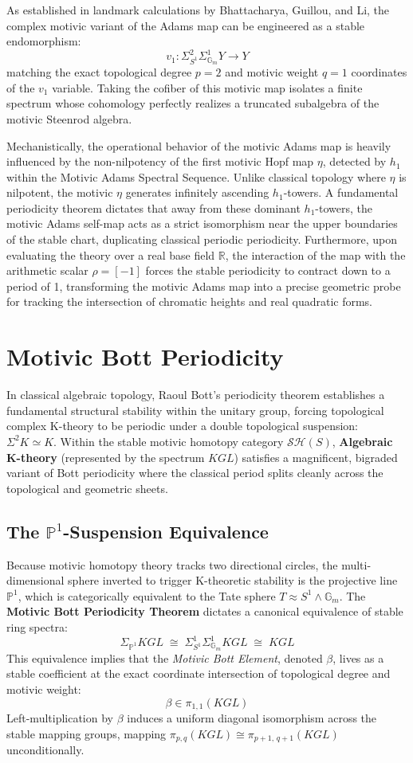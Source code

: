 \documentclass[11pt,oneside]{article}
\begin{document}
As established in landmark calculations by Bhattacharya, Guillou, and Li, the complex motivic variant of the Adams map can be engineered as a stable endomorphism:
\[ v_1: \Sigma_{S^1}^2 \Sigma_{\mathbb{G}_m}^1 Y \longrightarrow Y \]
matching the exact topological degree $p=2$ and motivic weight $q=1$ coordinates of the $v_1$ variable. Taking the cofiber of this motivic map isolates a finite spectrum whose cohomology perfectly realizes a truncated subalgebra of the motivic Steenrod algebra.

Mechanistically, the operational behavior of the motivic Adams map is heavily influenced by the non-nilpotency of the first motivic Hopf map $\eta$, detected by $h_1$ within the Motivic Adams Spectral Sequence. Unlike classical topology where $\eta$ is nilpotent, the motivic $\eta$ generates infinitely ascending $h_1$-towers. A fundamental periodicity theorem dictates that away from these dominant $h_1$-towers, the motivic Adams self-map acts as a strict isomorphism near the upper boundaries of the stable chart, duplicating classical periodic periodicity. Furthermore, upon evaluating the theory over a real base field $\mathbb{R}$, the interaction of the map with the arithmetic scalar $\rho = [-1]$ forces the stable periodicity to contract down to a period of 1, transforming the motivic Adams map into a precise geometric probe for tracking the intersection of chromatic heights and real quadratic forms.

\section{Motivic Bott Periodicity}
In classical algebraic topology, Raoul Bott's periodicity theorem establishes a fundamental structural stability within the unitary group, forcing topological complex K-theory to be periodic under a double topological suspension: $\Sigma^2 K \simeq K$. Within the stable motivic homotopy category $\mathcal{S}\mathcal{H}(S)$, \textbf{Algebraic K-theory} (represented by the spectrum $KGL$) satisfies a magnificent, bigraded variant of Bott periodicity where the classical period splits cleanly across the topological and geometric sheets.

\subsection{The $\mathbb{P}^1$-Suspension Equivalence}
Because motivic homotopy theory tracks two directional circles, the multi-dimensional sphere inverted to trigger K-theoretic stability is the projective line $\mathbb{P}^1$, which is categorically equivalent to the Tate sphere $T \approx S^1 \wedge \mathbb{G}_m$. The \textbf{Motivic Bott Periodicity Theorem} dictates a canonical equivalence of stable ring spectra:
\[ \Sigma_{\mathbb{P}^1} KGL \;\cong\; \Sigma_{S^1}^1 \Sigma_{\mathbb{G}_m}^1 KGL \;\cong\; KGL \]
This equivalence implies that the \emph{Motivic Bott Element}, denoted $\beta$, lives as a stable coefficient at the exact coordinate intersection of topological degree and motivic weight:
\[ \beta \in \pi_{1,1}(KGL) \]
Left-multiplication by $\beta$ induces a uniform diagonal isomorphism across the stable mapping groups, mapping $\pi_{p,q}(KGL) \cong \pi_{p+1, \, q+1}(KGL)$ unconditionally.
\end{document}
